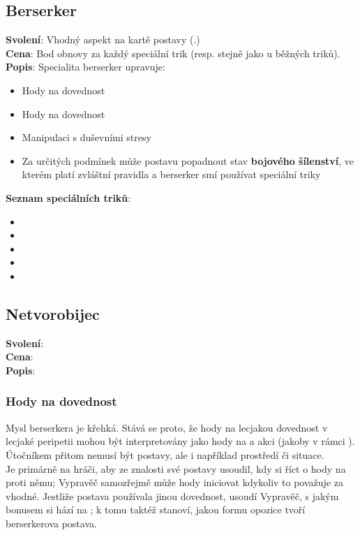 \begin{tcolorbox}
\subsection{Berserker}
\label{sec:berserker}
\textbf{Svolení}: Vhodný aspekt na kartě postavy (.)\\
\textbf{Cena}: Bod obnovy za každý speciální trik (resp. stejně jako u běžných triků).\\
\textbf{Popis}: Specialita berserker upravuje:
\begin{itemize}
    \item Hody na dovednost 
    \item Hody na dovednost 
    \item Manipulaci s duševními stresy
    \item Za určitých podmínek může postavu popadnout stav \textbf{bojového šílenství}, ve kterém platí zvláštní pravidla a berserker smí používat speciální triky
\end{itemize}
\textbf{Seznam speciálních triků}:
\begin{itemize}
    \item {}
    \item {}
    \item {}
    \item {}
    \item {}
\end{itemize}
\end{tcolorbox}

\begin{tcolorbox}
\subsection{Netvorobijec}
\label{sec:pov-netvorobijec}
\textbf{Svolení}:\\
\textbf{Cena}:\\
\textbf{Popis}:\\
\end{tcolorbox}

\subsubsection*{Hody na dovednost }
Mysl berserkera je křehká. Stává se proto, že hody na lecjakou dovednost v lecjaké peripetii mohou být interpretovány jako hody na  a akci  (jakoby v rámci ). Útočníkem přitom nemusí být postavy, ale i například prostředí či situace. \\
Je primárně na hráči, aby ze znalosti své postavy usoudil, kdy si říct o hody na  proti němu; Vypravěč samozřejmě může hody iniciovat kdykoliv to považuje za vhodné. Jestliže postava používala jinou dovednost, usoudí Vypravěč, s jakým bonusem si hází na ; k tomu taktéž stanoví, jakou formu opozice tvoří berserkerova postava.\\


